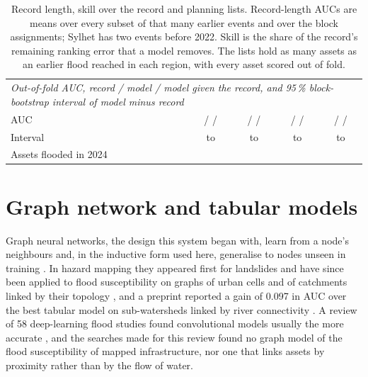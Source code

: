 \documentclass[11pt]{article}
\begin{document}
\begin{table}[tp]
\begin{tabular}{lcccc}
\midrule
\multicolumn{5}{l}{\emph{Out-of-fold AUC, record / model / model given the record, and 95\,\% block-bootstrap interval of model minus record}} \\
AUC & \RROofRecordAUC{} / \RROofModelAUC{} / \RROofBothAUC{} & \SylhetOofRecordAUC{} / \SylhetOofModelAUC{} / \SylhetOofBothAUC{} & \CoastalOofRecordAUC{} / \CoastalOofModelAUC{} / \CoastalOofBothAUC{} & \JamunaOofRecordAUC{} / \JamunaOofModelAUC{} / \JamunaOofBothAUC{} \\
Interval & \RROofGapLow{} to \RROofGapHigh{} & \SylhetOofGapLow{} to \SylhetOofGapHigh{} & \CoastalOofGapLow{} to \CoastalOofGapHigh{} & \JamunaOofGapLow{} to \JamunaOofGapHigh{} \\
\midrule
Assets flooded in 2024 & \RRPlanAllFlooded{} & \SylhetPlanAllFlooded{} & \CoastalPlanAllFlooded{} & \JamunaPlanAllFlooded{} \\
\bottomrule
\end{tabular}
\caption{Record length, skill over the record and planning lists. Record-length AUCs are means over every subset of that many earlier events and over the block assignments; Sylhet has two events before 2022. Skill is the share of the record's remaining ranking error that a model removes. The lists hold as many assets as an earlier flood reached in each region, with every asset scored out of fold.}
\label{tab:record}
\end{table}

\section{Graph network and tabular models}
\label{sec:benchmark}

Graph neural networks, the design this system began with, learn from a node's neighbours and, in the inductive form used here, generalise to nodes unseen in training \citep{hamilton2017}. In hazard mapping they appeared first for landslides \citep{wang2023, ma2025} and have since been applied to flood susceptibility on graphs of urban cells \citep{wanggat2023} and of catchments linked by their topology \citep{liu2026}, and a preprint reported a gain of 0.097 in AUC over the best tabular model on sub-watersheds linked by river connectivity \citep{sharma2026}. A review of 58 deep-learning flood studies found convolutional models usually the more accurate \citep{bentivoglio2022}, and the searches made for this review found no graph model of the flood susceptibility of mapped infrastructure, nor one that links assets by proximity rather than by the flow of water.
\end{document}
